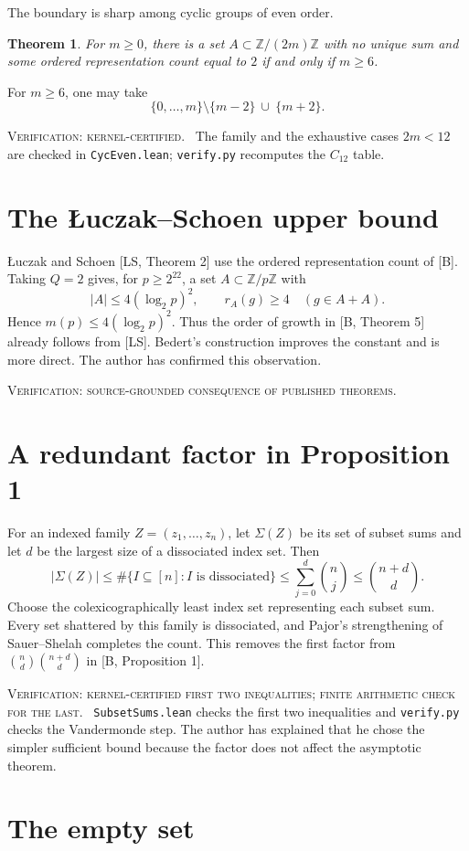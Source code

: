 \documentclass[10pt]{article}
\newcommand{\ZZ}{\mathbb Z}
\newcommand{\tier}[1]{\par\smallskip\noindent\textsc{Verification: #1.}\ }
\theoremstyle{plain}
\newtheorem*{theorem}{Theorem}
\begin{document}
The boundary is sharp among cyclic groups of even order.
\begin{theorem}
For $m\geq0$, there is a set $A\subset\ZZ/(2m)\ZZ$ with no unique sum and
some ordered representation count equal to $2$ if and only if $m\geq6$.
\end{theorem}
For $m\geq6$, one may take
\[
 \{0,\ldots,m\}\setminus\{m-2\}\ \cup\ \{m+2\}.
\]
\tier{kernel-certified}
The family and the exhaustive cases $2m<12$ are checked in
\texttt{CycEven.lean}; \texttt{verify.py} recomputes the $C_{12}$ table.

\section{The {\L}uczak--Schoen upper bound}

{\L}uczak and Schoen [LS, Theorem 2] use the ordered representation count of
[B]. Taking $Q=2$ gives, for $p\geq2^{22}$, a set
$A\subset\ZZ/p\ZZ$ with
\[
 |A|\leq4(\log_2p)^2,\qquad r_A(g)\geq4\quad(g\in A+A).
\]
Hence $m(p)\leq4(\log_2p)^2$. Thus the order of growth in [B, Theorem 5]
already follows from [LS]. Bedert's construction improves the constant and
is more direct. The author has confirmed this observation.
\tier{source-grounded consequence of published theorems}

\section{A redundant factor in Proposition 1}

For an indexed family $Z=(z_1,\ldots,z_n)$, let $\Sigma(Z)$ be its set of
subset sums and let $d$ be the largest size of a dissociated index set. Then
\[
 |\Sigma(Z)|\leq
 \#\{I\subseteq[n]:I\text{ is dissociated}\}
 \leq\sum_{j=0}^{d}\binom nj
 \leq\binom{n+d}{d}.
\]
Choose the colexicographically least index set representing each subset sum.
Every set shattered by this family is dissociated, and Pajor's strengthening
of Sauer--Shelah completes the count. This removes the first factor from
$\binom nd\binom{n+d}{d}$ in [B, Proposition 1].
\tier{kernel-certified first two inequalities; finite arithmetic check for the last}
\texttt{SubsetSums.lean} checks the first two inequalities and
\texttt{verify.py} checks the Vandermonde step. The author has explained that
he chose the simpler sufficient bound because the factor does not affect the
asymptotic theorem.

\section{The empty set}
\end{document}
